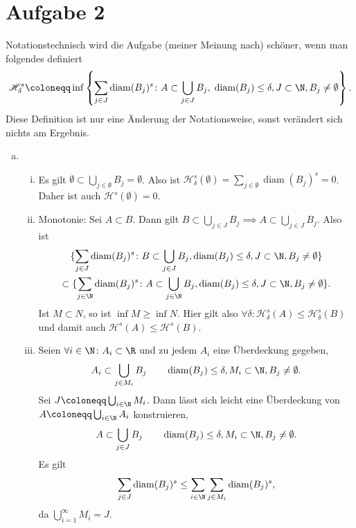 \documentclass{article}
\newcommand{\diam}{\operatorname{diam}}
\begin{document}
    \section*{Aufgabe 2}
    Notationstechnisch wird die Aufgabe (meiner Meinung nach) schöner, wenn man folgendes definiert
        \[
            \mathscr H_\delta^s \coloneqq \inf \left\{\sum_{j \in J} \diam(B_j)^s \colon A\subset \bigcup_{j\in J} B_j,\; \diam(B_j) \leq \delta, J\subset \N, B_j \neq \emptyset\right\}.
        \]
    Diese Definition ist nur eine Änderung der Notationsweise, sonst verändert sich nichts am Ergebnis.
    \begin{enumerate}[(a)]
        \item \begin{enumerate}[(i)]
            \item Es gilt $\emptyset \subset \bigcup_{j\in \emptyset} B_j = \emptyset$. Also ist $\mathscr H_\delta^s(\emptyset) = \sum_{j \in \emptyset} \diam(B_j)^s = 0$. Daher ist auch $\mathscr H ^s (\emptyset) = 0$.
            \item Monotonie: Sei $A \subset B$. Dann gilt $B \subset \bigcup_{j\in J} B_j \implies A \subset \bigcup_{j\in J} B_j$. Also ist 
            \begin{multline*}
                \{\sum_{j \in J} \diam(B_j)^s\colon B \subset \bigcup_{j\in J} B_j,\diam(B_j) \leq \delta, J\subset \N, B_j \neq \emptyset\}\\ \subset \{\sum_{j \in \N} \diam(B_j)^s\colon A \subset \bigcup_{j\in \N} B_j,\diam(B_j) \leq \delta, J\subset \N, B_j \neq \emptyset\}.
            \end{multline*}
            Ist $M \subset N$, so ist $\inf M \geq \inf N$. Hier gilt also $\forall \delta\colon \mathscr H_\delta^s(A) \leq \mathscr H_\delta^s(B)$ und damit auch $\mathscr H^s(A) \leq \mathscr H^s(B)$.
            \item Seien $\forall i \in \N\colon A_i \subset \R$ und zu jedem $A_i$ eine Überdeckung gegeben,
            \[
                A_i \subset \bigcup_{j \in M_i} B_j\qquad \diam(B_j)\leq \delta, M_i \subset \N, B_j \neq \emptyset.
            \] Sei $J \coloneqq \bigcup_{i \in \N} M_i$. Dann lässt sich leicht eine Überdeckung von $A \coloneqq \bigcup_{i\in \N} A_i$ konstruieren,
            \[
                A \subset\bigcup_{j \in J} B_j\qquad \diam(B_j)\leq \delta, M_i \subset \N, B_j \neq \emptyset.
            \] Es gilt
            \[
                \sum_{j \in J} \diam(B_j)^s \leq \sum_{i \in \N} \sum_{j \in M_i} \diam(B_j)^s, 
            \]
            da $\bigcup_{i=1}^\infty M_i = J$.

\end{enumerate}
\end{enumerate}
\end{document}
